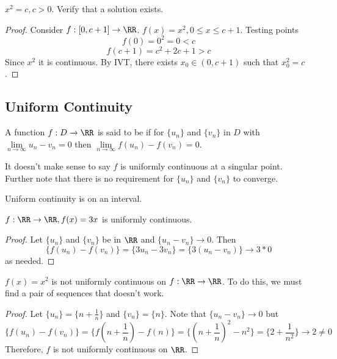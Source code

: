 \documentclass[12pt]{scrartcl}
\begin{document}
\begin{example}
  $x^2 = c, c > 0$. Verify that a solution exists. 
  \begin{proof}
    Consider $f: [0, c + 1] \to \RR$. $f(x) = x^2, 0 \leq x \leq c+ 1$. Testing points
    \[f(0) = 0^2 = 0 < c\]
    \[f(c + 1) = c^2 + 2c + 1 > c\]
    Since $x^2$ it is continuous. By IVT, there exists $x_0 \in (0, c + 1)$ such that $x_0^2 = c$.
  \end{proof}
\end{example}

\subsection{Uniform Continuity}

\begin{definition}
  A function $f: D \to \RR$ is said to be  if for $\{u_n\}$ and 
  $\{v_n\}$ in $D$ with $\underset{n\to\infty}{\lim}u_n - v_n = 0$ then $\underset{n\to\infty}{\lim}f(u_n) - f(v_n) = 0$. 
\end{definition}

\begin{note}
  It doesn't make sense to say $f$ is uniformly continuous at a singular point. Further note that 
  there is no requirement for $\{u_n\}$ and $\{v_n\}$ to converge. 
\end{note}

\begin{remark}
  Uniform continuity is on an interval. 
\end{remark}

\begin{example}
  $f: \RR \to \RR, f(x) = 3x$ is uniformly continuous. 

  \begin{proof}
    Let $\{u_n\}$ and $\{v_n\}$ be in $\RR$ and $\{u_n - v_n\} \to 0$. Then 
    \[\{f(u_n) - f(v_n)\} = \{3u_n - 3v_n\} = \{3(u_n - v_n)\} \to 3 * 0\]
    as needed.
  \end{proof}
\end{example}

\begin{example}
  $f(x) = x^2$ is not uniformly continuous on $f: \RR \to \RR$. To do this, we must 
  find a pair of sequences that doesn't work.

  \begin{proof}
    Let $\{u_n\} = \{n + \frac{1}{n}\}$ and $\{v_n\} = \{n\}$. Note that 
    $\{u_n - v_n\} \to 0$ but 
    \[\{f(u_n) - f(v_n)\} = \{f(n + \frac{1}{n}) - f(n)\} = \{(n + \frac{1}{n})^2 - n^2\} = \{2 + \frac{1}{n^2}\} \to 2 \neq 0\]    
    Therefore, $f$ is not uniformly continuous on $\RR$.
  \end{proof}
\end{example}
\end{document}

